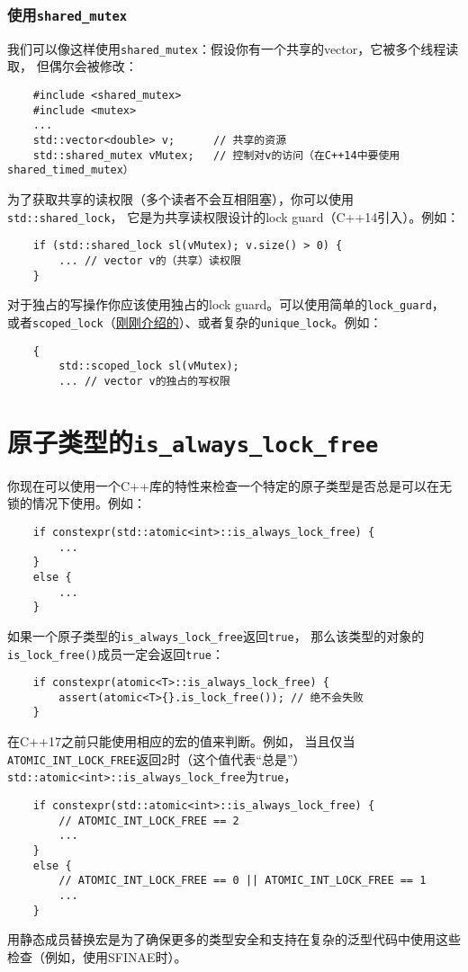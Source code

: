 \subsubsection{使用\texttt{shared\_mutex}}
我们可以像这样使用\texttt{shared\_mutex}：假设你有一个共享的vector，它被多个线程读取，
但偶尔会被修改：
\begin{lstlisting}
    #include <shared_mutex>
    #include <mutex>
    ...
    std::vector<double> v;      // 共享的资源
    std::shared_mutex vMutex;   // 控制对v的访问（在C++14中要使用shared_timed_mutex）
\end{lstlisting}
为了获取共享的读权限（多个读者不会互相阻塞），你可以使用\texttt{std::shared\_lock}，
它是为共享读权限设计的lock guard（C++14引入）。例如：
\begin{lstlisting}
    if (std::shared_lock sl(vMutex); v.size() > 0) {
        ... // vector v的（共享）读权限
    }
\end{lstlisting}
对于独占的写操作你应该使用独占的lock guard。可以使用简单的\texttt{lock\_guard}，
或者\texttt{scoped\_lock}（\hyperref[ch27.1.1]{刚刚介绍的}）、或者复杂的\texttt{unique\_lock}。例如：
\begin{lstlisting}
    {
        std::scoped_lock sl(vMutex);
        ... // vector v的独占的写权限
\end{lstlisting}


\section{原子类型的\texttt{is\_always\_lock\_free}}
你现在可以使用一个C++库的特性来检查一个特定的原子类型是否总是可以在无锁的情况下使用。例如：
\begin{lstlisting}
    if constexpr(std::atomic<int>::is_always_lock_free) {
        ...
    }
    else {
        ...
    }
\end{lstlisting}
如果一个原子类型的\texttt{is\_always\_lock\_free}返回\texttt{true}，
那么该类型的对象的\texttt{is\_lock\_free()}成员一定会返回\texttt{true}：
\begin{lstlisting}
    if constexpr(atomic<T>::is_always_lock_free) {
        assert(atomic<T>{}.is_lock_free()); // 绝不会失败
    }
\end{lstlisting}
在C++17之前只能使用相应的宏的值来判断。例如，
当且仅当\texttt{ATOMIC\_INT\_LOCK\_FREE}返回\texttt{2}时（这个值代表“总是”）
\texttt{std::atomic<int>::is\_always\_lock\_free}为\texttt{true}，
\begin{lstlisting}
    if constexpr(std::atomic<int>::is_always_lock_free) {
        // ATOMIC_INT_LOCK_FREE == 2
        ...
    }
    else {
        // ATOMIC_INT_LOCK_FREE == 0 || ATOMIC_INT_LOCK_FREE == 1
        ...
    }
\end{lstlisting}
用静态成员替换宏是为了确保更多的类型安全和支持在复杂的泛型代码中使用这些检查（例如，使用SFINAE时）。

